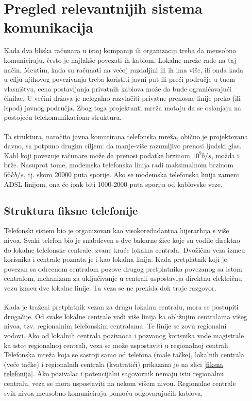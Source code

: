 \documentclass{article} %
\begin{document}
\section{Pregled relevantnijih sistema komunikacija}
Kada dva bliska ra\v cunara u istoj kompaniji ili organizaciji treba da me\dj usobno komuniciraju, \v cesto je najlak\v se povezati ih kablom. Lokalne mre\v ze rade na taj na\v cin. Me\dj utim, kada su ra\v cunati na ve\' coj razdaljini ili ih ima vi\v se, ili onda kada u cilju njihovog povezivanja treba koristiti javni put ili pre\' ci podru\v cje u tu\dj em vlasni\v stvu, cena postavljanja privatnih kablova mo\v ze da bude ograni\v cavaju\' ci \v cinilac. U ve\' cini dr\v zava je nelegalno razvla\v citi privatne prenosne linije preko (ili ispod) javnog podru\v cja.  Zbog toga projektanti mre\v za motaju da se oslanjaju na postoje\' cu telekomunikacionu strukturu. 
\\
\\Ta struktura, naro\v cito javna komutirana telefonska mre\v za, obi\v cno je projektovana davno, sa potpuno drugim ciljem: da manje-vi\v se razumljivo prenosi ljudski glas. Kabl koji povezuje ra\v cunare mo\v ze da prenosi podatke brzinom $10^9b/s$, mo\v zda i br\v ze. Nasuprot tome, modemska telefonska linija radi maksimalnom brzinom $56 kb/s$, tj. skoro 20000 puta sporije. Ako se modemska telefonska linija zameni ADSL linijom, ona \' ce ipak biti 1000-2000 puta sporija od kablovske veze.



\subsection{Struktura fiksne telefonije}

Telefonski sistem bio je organizovan kao visokoredudantna hijerarhija s vi\v se nivoa. Svaki telefon bio je snabdeven s dve bakarne \v zice koje su vodile direktno do lokalne telefonske centrale, zvane kra\' ce lokalna centrala. Dvo\v zi\v cna veza izme\dj u korisnika i centrale poznata je i kao lokalna linija. Kada pretplatnik koji je povezan sa odre\dj enom centralom pozove drugog pretplatnika povezanog sa istom centralom, mehanizam za uklju\v civanje u centrali uspostavlja direktnu elektri\v cnu vezu izme\dj u dve lokalne linije. Ta veza se ne prekida dok traje razgovor. 
\\
\\ Kada je tra\v zeni pretplatnik vezan za drugu lokalnu centralu, mora se postupiti druga\v cije. Od svake lokalne centrale vodi vi\v se linija ka obli\v znjim centralama vi\v seg nivoa, tzv. regionalnim telefonskim centralama. Te linije se zovu regionalni vodovi. Ako od lokalnih centrala pozivaoca i pozvanog korisnika vode magistrale ka istoj regionalnoj centrali, veza se mo\v ze uspostaviti u regionalnoj centrali. Telefonska mre\v za koja se sastoji samo od telefona (male ta\v cke), lokalnih centrala (ve\' ce ta\v cke) i regionalnih centrala (kvatrati\' ci) prikazana je na slici \ref{fiksna telefonija}. Ako pozivalac i potencijalni sagovornik nemaju istu regionalnu centralu, veza se mora uspostaviti na nekom vi\v sem nivou. Regionalne centrale svih nivoa me\dj usobno komuniciraju pomo\' cu odgovaraju\' cih kablova.
\end{document}
